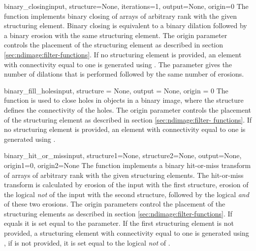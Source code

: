 \begin{funcdesc}{binary_closing}{input, structure=None, iterations=1,
  output=None, origin=0} The  function implements
  binary closing of arrays of arbitrary rank with the given structuring
  element. Binary closing is equivalent to a binary dilation followed by a
  binary erosion with the same structuring element. The origin parameter
  controls the placement of the structuring element as described in section
  \ref{sec:ndimage:filter-functions}. If no structuring element is 
  provided, an element with connectivity equal to one is generated using
  . The  parameter   
  gives the number of dilations that is performed followed by the same 
  number of erosions.
\end{funcdesc}

\begin{funcdesc}{binary_fill_holes}{input, structure = None, output = None, 
origin = 0} The  function is used to close 
holes in objects in a binary image, where the structure defines the 
connectivity of the holes. The origin parameter controls the placement of 
the structuring element as described in section \ref{sec:ndimage:filter-
functions}. If no structuring element is provided, an element with 
connectivity equal to one is generated using 
. 
\end{funcdesc}

\begin{funcdesc}{binary_hit_or_miss}{input, structure1=None, 
  structure2=None, output=None, origin1=0, origin2=None} The 
  function implements a binary hit-or-miss transform of arrays of arbitrary
  rank with the given structuring elements.  The hit-or-miss transform is
  calculated by erosion of the input with the first structure, erosion of   
  the logical \emph{not} of the input with the second structure, followed 
  by the logical \emph{and} of these two erosions.  The origin parameters 
  control the placement of the structuring elements as described in section
  \ref{sec:ndimage:filter-functions}. If  equals 
   it is set equal to the  parameter. If the 
  first structuring element is not provided, a structuring element with 
  connectivity equal to one is generated using 
  , if  is not 
  provided, it is set equal to the logical \emph{not} of .
\end{funcdesc}


